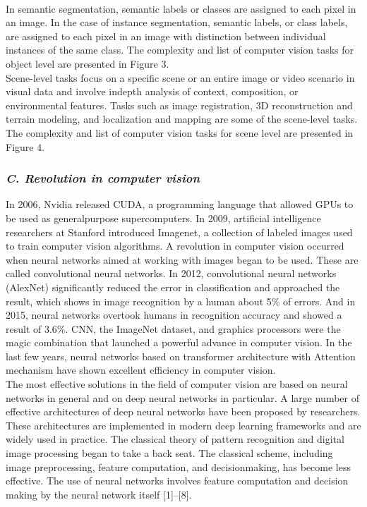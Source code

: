 \documentclass{article}
\begin{document}
{{\begin{multicols}
\begin{flushleft}
\\\hspace{4mm}In semantic segmentation, semantic labels or classes are assigned to each pixel in an image. In the case of instance segmentation, semantic labels, or class labels, are assigned to each pixel in an image with distinction between individual instances of the same class. The complexity and list of computer vision tasks for object level are presented in Figure 3. \\\hspace{4mm}Scene-level tasks focus on a specific scene or an entire image or video scenario in visual data and involve indepth analysis of context, composition, or environmental features. Tasks such as image registration, 3D reconstruction and terrain modeling, and localization and mapping are some of the scene-level tasks. The complexity and list of computer vision tasks for scene level are presented in Figure 4.\end{flushleft}
\subsubsection*{\textit{C. Revolution in computer vision}}
\center\begin{raggedright}\hspace{4mm}In 2006, Nvidia released CUDA, a programming language that allowed GPUs to be used as generalpurpose supercomputers. In 2009, artificial intelligence researchers at Stanford introduced Imagenet, a collection of labeled images used to train computer vision algorithms. A revolution in computer vision occurred when neural networks aimed at working with images began to be used. These are called convolutional neural networks. In 2012, convolutional neural networks (AlexNet) significantly reduced the error in classification and approached the result, which shows in image recognition by a human about 5\% of errors. And in 2015, neural networks overtook humans in recognition accuracy and showed a result of 3.6\%. CNN, the ImageNet dataset, and graphics processors were the magic combination that launched a powerful advance in computer vision. In the last few years, neural networks based on transformer architecture with Attention mechanism have shown excellent efficiency in computer vision. 
\\\hspace{4mm}The most effective solutions in the field of computer vision are based on neural networks in general and on deep neural networks in particular. A large number of effective architectures of deep neural networks have been proposed by researchers. These architectures are implemented in modern deep learning frameworks and are widely used in practice. The classical theory of pattern recognition and digital image processing began to take a back seat. The classical scheme, including image preprocessing, feature computation, and decisionmaking, has become less effective. The use of neural networks involves feature computation and decision making by the neural network itself [1]–[8].

\end{raggedright}
\end{multicols}}}
\end{document}
